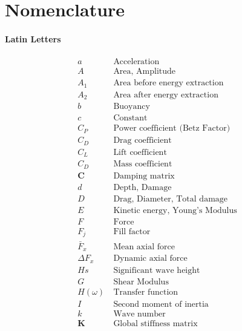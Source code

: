 \chapter*{Nomenclature}
\subsubsection*{Latin Letters}       
\begin{align*}
a    &\ \text{Acceleration}\\
A      &\ \text{Area, Amplitude}\\
A_1      &\ \text{Area before energy extraction}\\
A_2      &\ \text{Area after energy extraction}\\
b    &\ \text{Buoyancy}\\
c   &\ \text{Constant}\\
C_P      &\ \text{Power coefficient (Betz Factor)}\\
C_D      &\ \text{Drag coefficient}\\
C_L      &\ \text{Lift coefficient}\\
C_D      &\ \text{Mass coefficient}\\
\mathbf{C}      &\ \text{Damping matrix}\\
d      &\ \text{Depth, Damage}\\
D      &\ \text{Drag, Diameter, Total damage}\\
E      &\ \text{Kinetic energy, Young's Modulus}\\
F      &\ \text{Force}\\
F_j      &\ \text{Fill factor}\\
\bar{F}_x      &\ \text{Mean axial force}\\
\Delta F_x      &\ \text{Dynamic axial force}\\
Hs      &\ \text{Significant wave height}\\
G      &\ \text{Shear Modulus}\\
H(\omega)      &\ \text{Transfer function}\\
I     &\ \text{Second moment of inertia}\\
k      &\ \text{Wave number}\\
\mathbf{K}      &\ \text{Global stiffness matrix}\\
\end{align*}
\newpage
